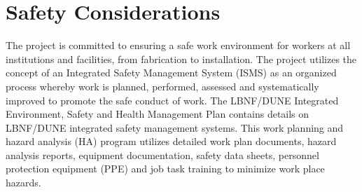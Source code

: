 \section{Safety Considerations}
\label{sec:fdsp-apa-safety}




The project is committed to ensuring a safe work environment for workers at all institutions and facilities, from  fabrication to installation. The project utilizes the concept of an Integrated Safety Management System (ISMS) as an organized process whereby work is planned, performed, assessed and systematically improved to promote the safe conduct of work. The LBNF/DUNE Integrated Environment, Safety and Health Management Plan \cite{bib:docdb291} %
contains details on LBNF/DUNE integrated safety management systems. This work planning and hazard analysis (HA) program utilizes detailed work plan documents, hazard analysis reports, equipment documentation, safety data sheets, personnel protection equipment (PPE) and job task training to minimize work place hazards. 

